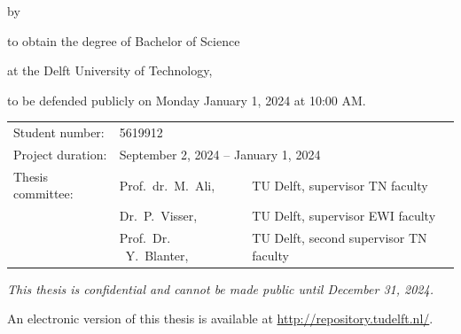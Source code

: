 \begin{titlepage}

\begin{center}

{\makeatletter
\largetitlestyle\fontsize{45}{45}\selectfont\@title
\makeatother}

{\makeatletter
\ifdefvoid{\@subtitle}{}{\bigskip\titlestyle\fontsize{20}{20}\selectfont\@subtitle}
\makeatother}

\bigskip
\bigskip

by

\bigskip
\bigskip

{\makeatletter
\largetitlestyle\fontsize{25}{25}\selectfont\@author
\makeatother}

\bigskip
\bigskip

to obtain the degree of Bachelor of Science

at the Delft University of Technology,

to be defended publicly on Monday January 1, 2024 at 10:00 AM.

\vfill

\begin{tabular}{lll}
    Student number: & 5619912 \\
    Project duration: & \multicolumn{2}{l}{September 2, 2024 -- January 1, 2024} \\
    Thesis committee: & Prof.\ dr.\ M.\ Ali, & TU Delft, supervisor TN faculty \\
        & Dr.\ P.\ Visser, & TU Delft, supervisor EWI faculty \\
        & Prof.\ Dr. \ Y.\ Blanter, & TU Delft, second supervisor TN faculty
\end{tabular}

\bigskip
\bigskip
\emph{This thesis is confidential and cannot be made public until December 31, 2024.}

\bigskip
\bigskip

\bigskip
\bigskip
An electronic version of this thesis is available at \url{http://repository.tudelft.nl/}.

\end{center}


\end{titlepage}
